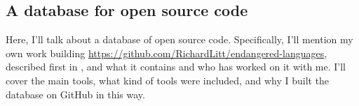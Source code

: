%
%



\subsection{A database for open source code}\label{sec:solutions}

Here, I'll talk about a database of open source code. Specifically, I'll mention my own work building \href{https://github.com/RichardLitt/endangered-languages}{https://github.com/RichardLitt/endangered-languages}, described first in \citet{CCURL}, and what it contains and who has worked on it with me. I'll cover the main tools, what kind of tools were included, and why I built the database on GitHub in this way.

